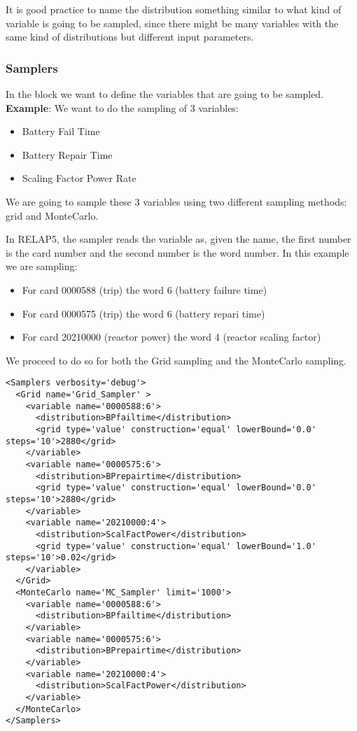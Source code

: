 It is good practice to name the distribution something similar to what kind of
variable is going to be sampled, since there might be many variables with the
same kind of distributions but different input parameters.
%
\subsubsection{Samplers}
In the  block we want to define the variables that are going
to be sampled.
%
\textbf{Example}:
We want to do the sampling of 3 variables:
\begin{itemize}
  \item Battery Fail Time
  \item Battery Repair Time
  \item Scaling Factor Power Rate
\end{itemize}

We are going to sample these 3 variables using two different sampling methods:
grid and MonteCarlo.

In RELAP5, the sampler reads the variable as, given the name, the first number
is the card number and the second number is the word number.
%
In this example we are sampling:
\begin{itemize}
  \item For card 0000588 (trip) the word 6 (battery failure time)
  \item For card 0000575 (trip) the word 6 (battery repari time)
  \item For card 20210000 (reactor power) the word 4 (reactor scaling factor)
\end{itemize}

We proceed to do so for both the Grid sampling and the MonteCarlo sampling.

\begin{lstlisting}[style=XML,morekeywords={name,type,construction,lowerBound,steps,limit,initial_seed}]
<Samplers verbosity='debug'>
  <Grid name='Grid_Sampler' >
    <variable name='0000588:6'>
      <distribution>BPfailtime</distribution>
      <grid type='value' construction='equal' lowerBound='0.0' steps='10'>2880</grid>
    </variable>
    <variable name='0000575:6'>
      <distribution>BPrepairtime</distribution>
      <grid type='value' construction='equal' lowerBound='0.0' steps='10'>2880</grid>
    </variable>
    <variable name='20210000:4'>
      <distribution>ScalFactPower</distribution>
      <grid type='value' construction='equal' lowerBound='1.0' steps='10'>0.02</grid>
    </variable>
  </Grid>
  <MonteCarlo name='MC_Sampler' limit='1000'>
    <variable name='0000588:6'>
      <distribution>BPfailtime</distribution>
    </variable>
    <variable name='0000575:6'>
      <distribution>BPrepairtime</distribution>
    </variable>
    <variable name='20210000:4'>
      <distribution>ScalFactPower</distribution>
    </variable>
  </MonteCarlo>
</Samplers>
\end{lstlisting}

